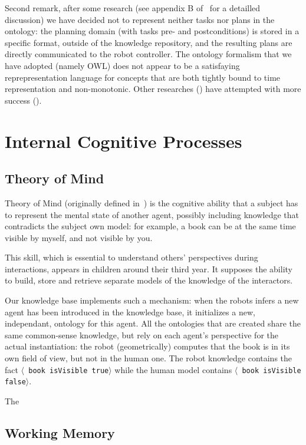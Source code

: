 \documentclass[letterpaper, 10 pt, conference]{ieeeconf}  %
\newcommand{\stmt}[1]{{\footnotesize \tt $\langle$ #1\relax$\rangle$}}
\begin{document}
Second remark, after some research (see appendix B of~\cite{Lemaignan2012a} for a
detailled discussion)  we have decided not to represent neither tasks nor plans
in the ontology: the planning domain (with tasks pre- and postconditions) is
stored in a specific format, outside of the knowledge repository, and the
resulting plans are directly communicated to the robot controller. The ontology
formalism that we have adopted (namely OWL) does not appear to be a satisfaying
reprepresentation language for concepts that are both tightly bound to time
representation and non-monotonic. Other researches (\cite{tenorth...}) have attempted with more success ().

\section{Internal Cognitive Processes}
\label{sect|intern}

\subsection{Theory of Mind}

Theory of Mind (originally defined in~\cite{Premack1978}) is the
cognitive ability that a subject has to represent the mental state of another
agent, possibly including knowledge that contradicts the subject own model: for
example, a book can be at the same time visible by myself, and not visible by
you.

This skill, which is essential to understand others' perspectives during
interactions, appears in children around their third year. It supposes the ability to build, store and retrieve separate models of the knowledge of the interactors.

Our knowledge base implements such a mechanism: when the robots infers a new
agent has been introduced in the knowledge base, it initializes a new,
independant, ontology for this agent. All the ontologies that are created share
the same common-sense knowledge, but rely on each agent's perspective for the
actual instantiation: the robot (geometrically) computes that the book is in
its own field of view, but not in the human one. The robot knowledge contains
the fact \stmt{book isVisible true} while the human model contains \stmt{book
isVisible false}.

The \cite{Warnier2012a}

\subsection{Working Memory}
\end{document}
